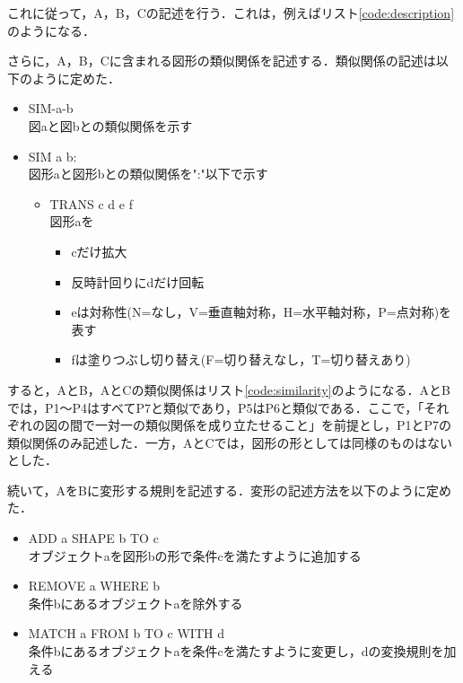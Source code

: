 \documentclass{jarticle}
\begin{document}
これに従って，A，B，Cの記述を行う．これは，例えばリスト\ref{code:description}のようになる．
\lstset{style=customplain}






さらに，A，B，Cに含まれる図形の類似関係を記述する．類似関係の記述は以下のように定めた．
\begin{itemize}
\item SIM-a-b\\
	図aと図bとの類似関係を示す
\item SIM a b:\\
	図形aと図形bとの類似関係を":"以下で示す
	\begin{itemize}
	\item TRANS c d e f\\
		図形aを
		\begin{itemize}
		\item cだけ拡大
		\item 反時計回りにdだけ回転
		\item eは対称性(N=なし，V=垂直軸対称，H=水平軸対称，P=点対称)を表す
		\item fは塗りつぶし切り替え(F=切り替えなし，T=切り替えあり)
		\end{itemize}
	\end{itemize}
\end{itemize}

すると，AとB，AとCの類似関係はリスト\ref{code:similarity}のようになる．AとBでは，P1〜P4はすべてP7と類似であり，P5はP6と類似である．ここで，「それぞれの図の間で一対一の類似関係を成り立たせること」を前提とし，P1とP7の類似関係のみ記述した．一方，AとCでは，図形の形としては同様のものはないとした．
\lstset{style=customplain}






続いて，AをBに変形する規則を記述する．変形の記述方法を以下のように定めた．
\begin{itemize}
\item ADD a SHAPE b TO c\\
	オブジェクトaを図形bの形で条件cを満たすように追加する
\item REMOVE a WHERE b\\
	条件bにあるオブジェクトaを除外する
\item MATCH a FROM b TO c WITH d\\
	条件bにあるオブジェクトaを条件cを満たすように変更し，dの変換規則を加える
\end{itemize}
\end{document}
